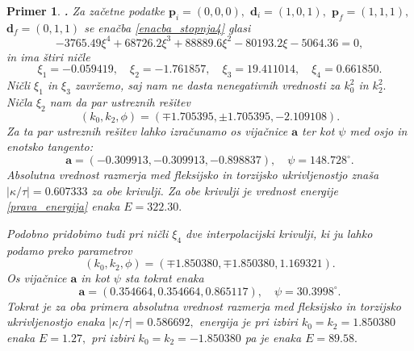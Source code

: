 \documentclass[12pt,a4paper,twoside]{article}
\theoremstyle{definition} %
\theoremstyle{plain} %
\theoremstyle{primerstyle}
\newtheorem{primer}[definicija]{Primer}
\numberwithin{equation}{section}  %
\newcommand{\aV}{\mathbf{a}}
\newcommand{\dV}{\mathbf{d}}
\newcommand{\pV}{\mathbf{p}}
\begin{document}
\begin{primer}
	\label{interpolacija_primer}
	\textbf{. }Za začetne podatke $\pV_i=(0,0,0),$ $\dV_i=(1,0,1),$ $\pV_f=(1,1,1),$ $\dV_f=(0,1,1)$ se enačba \eqref{enacba_stopnja4} glasi
	\begin{equation}
		\label{primer_enacbast4}
		-3765.49\xi^4+68726.2\xi^3+88889.6\xi^2-80193.2\xi-5064.36=0,
	\end{equation}
	in ima štiri ničle
	\begin{equation}
		\label{hermit_nicle}
		\xi_1=-0.059419,\quad\xi_2=-1.761857,\quad\xi_3=19.411014,\quad\xi_4=0.661850.
	\end{equation}
	Ničli $\xi_1$ in $\xi_3$ zavržemo, saj nam ne dasta nenegativnih vrednosti za $k_0^2$ in $k_2^2.$ Ničla $\xi_2$ nam da par ustreznih rešitev
	\begin{equation}
		\label{par_resitev1}
		(k_0,k_2,\phi)=(\mp1.705395,\pm1.705395,-2.109108).
	\end{equation}
	Za ta par ustreznih rešitev lahko izračunamo os vijačnice $\aV$ ter kot $\psi$ med osjo in enotsko tangento:
	\begin{equation}
		\label{par_resitev1_oskot}
		\aV=(-0.309913,-0.309913,-0.898837),\quad\psi=148.728^\circ.
	\end{equation}
	Absolutna vrednost razmerja med fleksijsko in torzijsko ukrivljenostjo znaša $|\kappa/\tau|=0.607333$ za obe krivulji. Za obe krivulji je vrednost energije \eqref{prava_energija} enaka $E=322.30.$
	
	Podobno pridobimo tudi pri ničli $\xi_4$ dve interpolacijski krivulji, ki ju lahko podamo preko parametrov
	\begin{equation}
		\label{par_resitev2}
		(k_0,k_2,\phi)=(\mp1.850380,\mp1.850380,1.169321).
	\end{equation}
	Os vijačnice $\aV$ in kot $\psi$ sta tokrat enaka
	\begin{equation}
		\label{par_resitev2_oskot}
		\aV=(0.354664,0.354664,0.865117),\quad\psi=30.3998^\circ.
	\end{equation}
	Tokrat je za oba primera absolutna vrednost razmerja med fleksijsko in torzijsko ukrivljenostjo enaka $|\kappa/\tau|=0.586692,$ energija je pri izbiri $k_0=k_2=1.850380$ enaka $E=1.27,$ pri izbiri $k_0=k_2=-1.850380$ pa je enaka $E=89.58.$
	

\end{primer}
\end{document}
